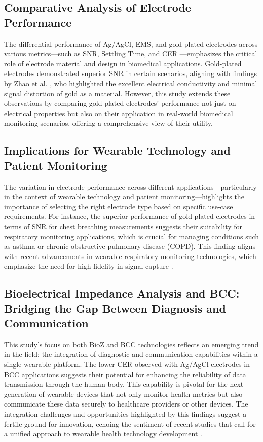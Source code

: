 \documentclass[conference]{IEEEtran}
\begin{document}
\subsection{Comparative Analysis of Electrode Performance}

The differential performance of Ag/AgCl, \gls{EMS}, and gold-plated electrodes across various metrics—such as \gls{SNR}, Settling Time, and \gls{CER} —emphasizes the critical role of electrode material and design in biomedical applications. Gold-plated electrodes demonstrated superior \gls{SNR} in certain scenarios, aligning with findings by Zhao et al. \cite{Zhao2018Fabrication}, who highlighted the excellent electrical conductivity and minimal signal distortion of gold as a material. However, this study extends these observations by comparing gold-plated electrodes' performance not just on electrical properties but also on their application in real-world biomedical monitoring scenarios, offering a comprehensive view of their utility.

\subsection{Implications for Wearable Technology and Patient Monitoring}

The variation in electrode performance across different applications—particularly in the context of wearable technology and patient monitoring—highlights the importance of selecting the right electrode type based on specific use-case requirements. For instance, the superior performance of gold-plated electrodes in terms of \gls{SNR} for chest breathing measurements suggests their suitability for respiratory monitoring applications, which is crucial for managing conditions such as asthma or chronic obstructive pulmonary disease (COPD). This finding aligns with recent advancements in wearable respiratory monitoring technologies, which emphasize the need for high fidelity in signal capture \cite{rabbani2023low}.

\subsection{Bioelectrical Impedance Analysis   and BCC: Bridging the Gap Between Diagnosis and Communication}

This study's focus on both \gls{BioZ}   and \gls{BCC} technologies reflects an emerging trend in the field: the integration of diagnostic and communication capabilities within a single wearable platform. The lower \gls{CER} observed with Ag/AgCl electrodes in \gls{BCC} applications suggests their potential for enhancing the reliability of data transmission through the human body. This capability is pivotal for the next generation of wearable devices that not only monitor health metrics but also communicate these data securely to healthcare providers or other devices. The integration challenges and opportunities highlighted by this findings suggest a fertile ground for innovation, echoing the sentiment of recent studies that call for a unified approach to wearable health technology development \cite{zaira2023prediction}.
\end{document}
